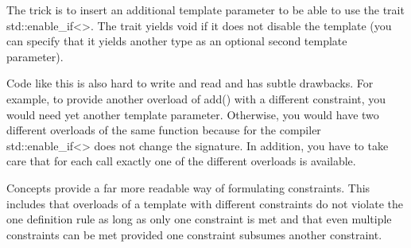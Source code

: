 The trick is to insert an additional template parameter to be able to use the trait std::enable\_if<>. The trait yields void if it does not disable the template (you can specify that it yields another type as an optional second template parameter).

Code like this is also hard to write and read and has subtle drawbacks. For example, to provide another overload of add() with a different constraint, you would need yet another template parameter. Otherwise, you would have two different overloads of the same function because for the compiler std::enable\_if<> does not change the signature. In addition, you have to take care that for each call exactly one of the different overloads is available.

Concepts provide a far more readable way of formulating constraints. This includes that overloads of a template with different constraints do not violate the one definition rule as long as only one constraint is met and that even multiple constraints can be met provided one constraint subsumes another constraint.




